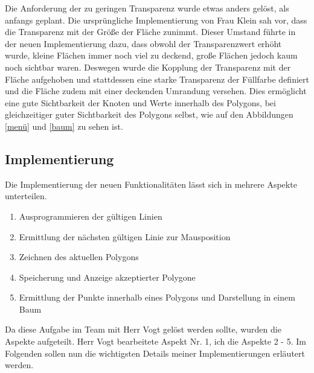 Die Anforderung der zu geringen Transparenz wurde etwas anders gelöst, als anfangs geplant. Die ursprüngliche Implementierung von Frau Klein sah vor, dass die Transparenz mit der Größe der Fläche zunimmt. Dieser Umstand führte in der neuen Implementierung dazu, dass obwohl der Transparenzwert erhöht wurde, kleine Flächen immer noch viel zu deckend, große Flächen jedoch kaum noch sichtbar waren. Deswegen wurde die Kopplung der Transparenz mit der Fläche aufgehoben und stattdessen eine starke Transparenz der Füllfarbe definiert und die Fläche zudem mit einer deckenden Umrandung versehen. Dies ermöglicht eine gute Sichtbarkeit der Knoten und Werte innerhalb des Polygons, bei gleichzeitiger guter Sichtbarkeit des Polygons selbst, wie auf den Abbildungen \ref{menü} und \ref{baum} zu sehen ist.



\subsection{Implementierung}

Die Implementierung der neuen Funktionalitäten lässt sich in mehrere Aspekte unterteilen.
\begin{enumerate}
\item Ausprogrammieren der gültigen Linien
\item Ermittlung der nächsten gültigen Linie zur Mausposition
\item Zeichnen des aktuellen Polygons
\item Speicherung und Anzeige akzeptierter Polygone
\item Ermittlung der Punkte innerhalb eines Polygons und Darstellung in einem Baum
\end{enumerate}

Da diese Aufgabe im Team mit Herr Vogt gelöst werden sollte, wurden die Aspekte aufgeteilt. Herr Vogt bearbeitete Aspekt Nr. 1, ich die Aspekte 2 - 5. Im Folgenden sollen nun die wichtigsten Details meiner Implementierungen erläutert werden.

